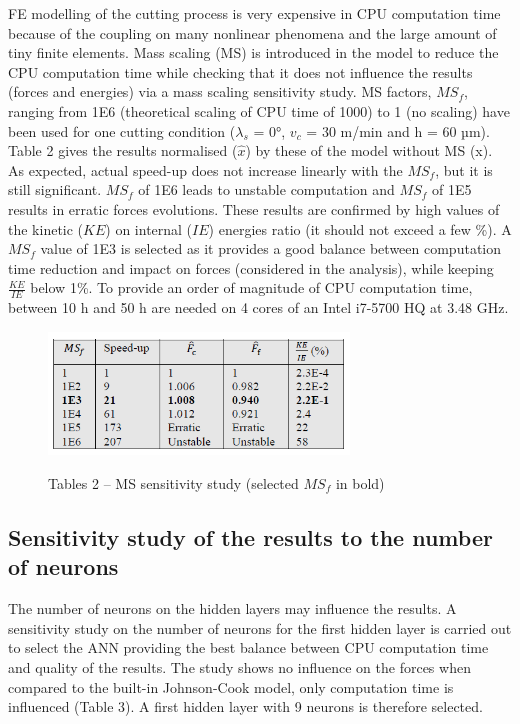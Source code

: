 \documentclass[final,5p,times,twocolumn]{elsarticle}
\begin{document}
FE modelling of the cutting process is very expensive in CPU computation time because of the coupling on many nonlinear phenomena and the large amount of tiny finite elements. Mass scaling (MS) is introduced in the model to reduce the CPU computation time while checking that it does not influence the results (forces and energies) via a mass scaling sensitivity study.
MS factors, ${MS}_f$, ranging from 1E6 (theoretical scaling of CPU time of 1000) to 1 (no scaling) have been used for one cutting condition ($\lambda_s$ = 0°, $v_c$ = 30 m/min and h = 60 µm). Table 2 gives the results normalised ($\hat{x}$) by these of the model without MS (x). As expected, actual speed-up does not increase linearly with the ${MS}_f$, but it is still significant. ${MS}_f$ of 1E6 leads to unstable computation and ${MS}_f$ of 1E5 results in erratic forces evolutions. These results are confirmed by high values of the kinetic ($KE$) on internal ($IE$) energies ratio (it should not exceed a few \%). A ${MS}_f$ value of 1E3 is selected as it provides a good balance between computation time reduction and impact on forces (considered in the analysis), while keeping $\frac{KE}{IE}$ below 1\%. To provide an order of magnitude of CPU computation time, between 10 h and 50 h are needed on 4 cores of an Intel i7-5700 HQ at 3.48 GHz.

\begin{figure}[h]
\centering
\caption{Tables 2 -- MS sensitivity study (selected ${MS}_f$ in bold)}
\includegraphics[width = 8cm]{Figures/Tab2}
\label{Tab2}
\end{figure}

\subsection{Sensitivity study of the results to the number of neurons}

The number of neurons on the hidden layers may influence the results. A sensitivity study on the number of neurons for the first hidden layer is carried out to select the ANN providing the best balance between CPU computation time and quality of the results. The study shows no influence on the forces when compared to the built-in Johnson-Cook model, only computation time is influenced (Table 3). A first hidden layer with 9 neurons is therefore selected.
\end{document}

